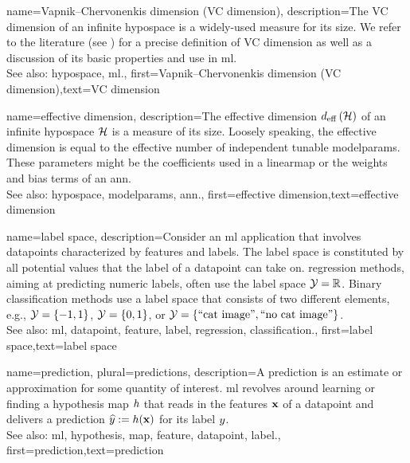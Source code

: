{name={Vapnik–Chervonenkis dimension (VC dimension)},
	description={The VC dimension of an infinite \gls{hypospace} is a widely-used measure 
		for its size. We refer to the literature (see \cite{ShalevMLBook}) for a precise definition of VC dimension 
		as well as a discussion of its basic properties and use in \gls{ml}.
					\\ 
		See also: \gls{hypospace}, \gls{ml}.},
	first={Vapnik–Chervonenkis dimension (VC dimension)},text={VC dimension}  
}

{name={effective dimension},
	description={The effective dimension $d_{\rm eff} \left( \mathcal{H} \right)$ of 
		an infinite \gls{hypospace} $\mathcal{H}$ is a measure of its size. Loosely speaking, the 
		effective dimension is equal to the effective number of independent tunable \gls{modelparams}. 
		These \glspl{parameter} might be the coefficients used in a \gls{linearmap} or the 
		\gls{weights} and bias terms of an \gls{ann}.
					\\ 
		See also: \gls{hypospace}, \gls{modelparams}, \gls{ann}.},
	first={effective dimension},text={effective dimension}  
}

{name={label space},
	description={Consider an \gls{ml} application that involves \glspl{datapoint} characterized by \glspl{feature} 
		and \glspl{label}. The \gls{label} space is constituted by all potential values that the \gls{label} 
		of a \gls{datapoint} can take on. \Gls{regression} methods, aiming at predicting numeric \glspl{label}, often
		 use the \gls{label} space $\mathcal{Y} = \mathbb{R}$. Binary \gls{classification} methods use a \gls{label} space 
 		that consists of two different elements, e.g., $\mathcal{Y} =\{-1,1\}$, $\mathcal{Y}=\{0,1\}$, 
		or $\mathcal{Y} = \{ \mbox{``cat image''}, \mbox{``no cat image''} \}$.
					\\ 
		See also: \gls{ml}, \gls{datapoint}, \gls{feature}, \gls{label}, \gls{regression}, \gls{classification}.}, first={label space},text={label space}  
}

{name={prediction}, plural={predictions},
	description={A prediction is an estimate or approximation for some 
		quantity of interest. \Gls{ml} revolves around learning or finding a \gls{hypothesis} \gls{map} $h$ 
		that reads in the \glspl{feature} ${\bf x}$ of a \gls{datapoint} and delivers a prediction 
		$\widehat{y} := h({\bf x})$ for its \gls{label} $y$.
					\\ 
		See also: \gls{ml}, \gls{hypothesis}, \gls{map}, \gls{feature}, \gls{datapoint}, \gls{label}.},
	first={prediction},text={prediction}  
}



